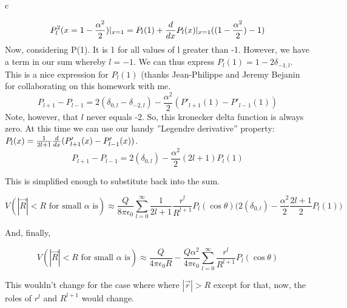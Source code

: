 \begin{homeworkProblem}
\begin{homeworkSection}{c}
\begin{center}
	\[
		P_l^2(x=1-\frac{\alpha^2}{2})|_{x=1} = P_l(1)+\frac{d{}}{d{x}}P_l(x)|_{x=1}((1-\frac{\alpha^2}{2})-1) 
	\]
	Now, considering P(1). It is 1 for all values of l greater than -1. However, we have a term in our sum whereby $l=-1$. We can thus express $P_l(1) = 1 - 2\delta_{-1,l}$. This is a nice expression for $P_l(1)$ (thanks Jean-Philippe and Jeremy Bejanin for collaborating on this homework with me.
	\[	
	P_{l+1}-P_{l-1} = 2 (\delta_{0,l}-\delta_{-2,l}) - \frac{\alpha^2}{2}(P'_{l+1}(1)-P'_{l-1}(1))
	\]
 Note, however, that $l$ never equals -2. So, this kronecker delta function is always zero. At this time we can use our handy ''Legendre derivative'' property: $P_l(x) = \frac{1}{2l+1}\frac{d{}}{d{x}}(P'_{l+1}(x)-P'_{l-1}(x))$.
  \[
	 P_{l+1}-P_{l-1} = 2 (\delta_{0,l}) - \frac{\alpha^2}{2}(2l+1)P_l(1)
	\]
\end{center}

This is simplified enough to substitute back into the sum.

\[
V(|\vec{R}|<R\text{ for small $\alpha$ is}) \approx \frac{Q}{8\pi\epsilon_0}\sum_{l=0}^{\infty} \frac{1}{2l+1}\frac{r^l}{R^{l+1}}P_l(\cos\theta) \bigg(2 (\delta_{0,l}) - \frac{\alpha^2}{2}\frac{2l+1}{2}P_l(1) \bigg)
\]

And, finally,

\[
V(|\vec{R}|<R\text{ for small $\alpha$ is}) \approx \frac{Q}{4\pi\epsilon_0 R} -  \frac{Q\alpha^2}{4\pi\epsilon_0}\sum_{l=0}^{\infty} \frac{r^l}{R^{l+1}}P_l(\cos\theta)
\]

This wouldn't change for the case where where $|\vec{r}|>R$ except for that, now, the roles of $r^l$ and $R^{l+1}$ would change.

\end{homeworkSection}

\end{homeworkProblem}